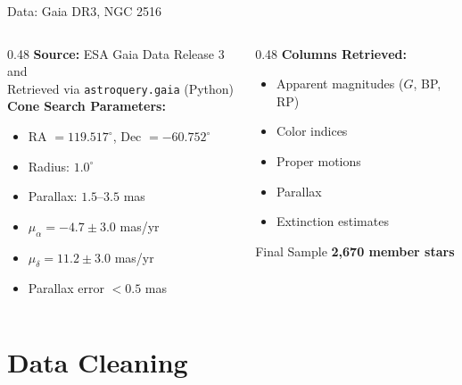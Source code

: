 \documentclass[aspectratio=169]{beamer}
\begin{document}
\begin{frame}{Data: Gaia DR3, NGC 2516}
  \begin{columns}[T]
    \begin{column}{0.48\textwidth}
      \textbf{Source:} ESA Gaia Data Release 3 \cite{gaia_dr3} and \cite{gaia_archive} \\[0.5em]
      Retrieved via \texttt{astroquery.gaia} (Python) \cite{astroquery_gaia} \\[1em]
      \textbf{Cone Search Parameters:}
      \begin{itemize}
        \item RA $= 119.517^{\circ}$, Dec $= -60.752^{\circ}$
        \item Radius: $1.0^{\circ}$
        \item Parallax: $1.5$--$3.5$ mas
        \item $\mu_\alpha = -4.7 \pm 3.0$ mas/yr
        \item $\mu_\delta = 11.2 \pm 3.0$ mas/yr
        \item Parallax error $< 0.5$ mas
      \end{itemize}
    \end{column}
    \begin{column}{0.48\textwidth}
      \textbf{Columns Retrieved:}
      \begin{itemize}
        \item Apparent magnitudes ($G$, BP, RP)
        \item Color indices
        \item Proper motions
        \item Parallax
        \item Extinction estimates
      \end{itemize}
      \vspace{1em}
      \begin{block}{Final Sample}
        \centering \large \textbf{2,670 member stars}
      \end{block}
    \end{column}
  \end{columns}
\end{frame}

\section{Data Cleaning}
\end{document}
